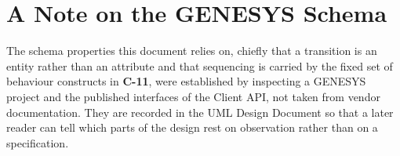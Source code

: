 \section{A Note on the GENESYS Schema}

The schema properties this document relies on, chiefly that a transition is an
entity rather than an attribute and that sequencing is carried by the fixed set
of behaviour constructs in \textbf{C-11}, were established by inspecting a
GENESYS project and the published interfaces of the Client API, not taken from
vendor documentation. They are recorded in the UML Design Document so that a
later reader can tell which parts of the design rest on observation rather than
on a specification.
